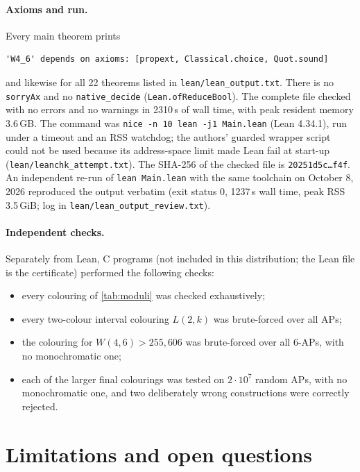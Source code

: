 \documentclass[11pt]{article}
\numberwithin{equation}{section}
\theoremstyle{definition}
\theoremstyle{remark}
\newcommand{\W}{W}
\begin{document}
\paragraph{Axioms and run.}
Every main theorem prints
\begin{lstlisting}
'W4_6' depends on axioms: [propext, Classical.choice, Quot.sound]
\end{lstlisting}
and likewise for all 22 theorems listed in \texttt{lean/lean\_output.txt}.  There is no
\texttt{sorryAx} and no \texttt{native\_decide} (\texttt{Lean.ofReduceBool}).  The complete file
checked with no errors and no warnings in 2310\,s of wall time, with peak resident memory
3.6\,GB.  The command was \texttt{nice -n 10 lean -j1 Main.lean} (Lean 4.34.1), run under a
timeout and an RSS watchdog; the authors' guarded wrapper script could not be used because its
address-space limit made Lean fail at start-up (\texttt{lean/leanchk\_attempt.txt}).
The SHA-256 of the checked file is \texttt{20251d5c\dots f4f}.  An independent re-run of \texttt{lean Main.lean} with the same toolchain
on October 8, 2026 reproduced the output verbatim (exit status 0, 1237\,s wall time, peak RSS 3.5\,GiB; log in
\texttt{lean/lean\_output\_review.txt}).

\paragraph{Independent checks.}
Separately from Lean, C programs (not included in this distribution; the Lean file is the
certificate) performed the following checks:
\begin{itemize}
\item every colouring of \cref{tab:moduli} was checked exhaustively;
\item every two-colour interval colouring $L(2,k)$ was brute-forced over all APs;
\item the colouring for $\W(4,6)>255{,}606$ was brute-forced over all $6$-APs, with no
  monochromatic one;
\item each of the larger final colourings was tested on $2\cdot10^7$ random APs, with no
  monochromatic one, and two deliberately wrong constructions were correctly rejected.
\end{itemize}

\section{Limitations and open questions}\label{sec:limits}
\end{document}
